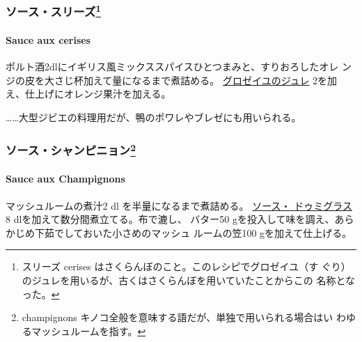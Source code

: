 \begin{recette}
{\subsubsection[ソース・スリーズ]{\texorpdfstring{ソース・スリーズ\footnote{スリーズ
  cerises はさくらんぼのこと。このレシピでグロゼイユ（す
  ぐり）のジュレを用いるが、古くはさくらんぼを用いていたことからこの
  名称となった。}}{ソース・スリーズ}}\label{ux30bdux30fcux30b9ux30b9ux30eaux30fcux30ba6}}

\hypertarget{sauce-aux-cerises}{%
\paragraph{Sauce aux cerises}\label{sauce-aux-cerises}}


ポルト酒2dlにイギリス風ミックススパイスひとつまみと、すりおろしたオレ
ンジの皮を大さじ\undemi{}杯加えて\deuxtiers{}量になるまで煮詰める。
\href{}{グロゼイユのジュレ}
2\undemi{}を加え、仕上げにオレンジ果汁を加える。

\ldots{}\ldots{}大型ジビエの料理用だが、鴨のポワレやブレゼにも用いられる。

\maeaki

\hypertarget{ux30bdux30fcux30b9ux30b7ux30e3ux30f3ux30d4ux30cbux30e7ux30f37}{%
\subsubsection[ソース・シャンピニョン]{\texorpdfstring{ソース・シャンピニョン\footnote{champignons
  キノコ全般を意味する語だが、単独で用いられる場合はい
  わゆるマッシュルームを指す。}}{ソース・シャンピニョン}}\label{ux30bdux30fcux30b9ux30b7ux30e3ux30f3ux30d4ux30cbux30e7ux30f37}}

\hypertarget{sauce-aux-champignons}{%
\paragraph{Sauce aux Champignons}\label{sauce-aux-champignons}}


マッシュルームの煮汁2\undemi{} dl を半量になるまで煮詰める。
\protect\hyperlink{sauce-demi-glace}{ソース・ ドゥミグラス}8
dlを加えて数分間煮立てる。布で漉し、 バター50
gを投入して味を調え、あらかじめ下茹でしておいた小さめのマッシュ
ルームの笠100 gを加えて仕上げる。


\end{recette}

